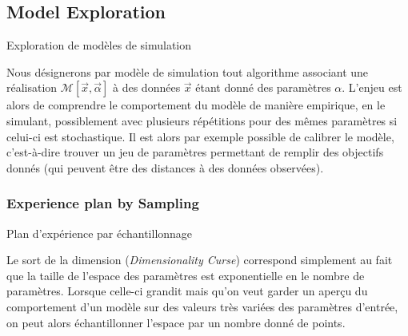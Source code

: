 






\subsection*{Model Exploration}{Exploration de modèles de simulation}

Nous désignerons par modèle de simulation tout algorithme associant une réalisation $\mathcal{M}\left[\vec{x},\vec{\alpha}\right]$ à des données $\vec{x}$ étant donné des paramètres $\alpha$. L'enjeu est alors de comprendre le comportement du modèle de manière empirique, en le simulant, possiblement avec plusieurs répétitions pour des mêmes paramètres si celui-ci est stochastique. Il est alors par exemple possible de calibrer le modèle, c'est-à-dire trouver un jeu de paramètres permettant de remplir des objectifs donnés (qui peuvent être des distances à des données observées).


\subsubsection*{Experience plan by Sampling}{Plan d'expérience par échantillonnage}

Le sort de la dimension (\emph{Dimensionality Curse}) correspond simplement au fait que la taille de l'espace des paramètres est exponentielle en le nombre de paramètres. Lorsque celle-ci grandit mais qu'on veut garder un aperçu du comportement d'un modèle sur des valeurs très variées des paramètres d'entrée, on peut alors échantillonner l'espace par un nombre donné de points.


